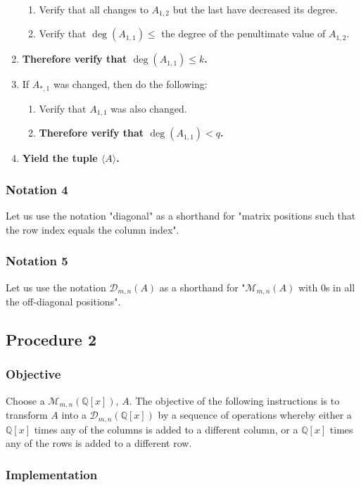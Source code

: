 \documentclass[twocolumn]{article}
\newcommand{\notation}[1]{\subsubsection*{Notation #1}}
\newcommand{\procedure}[2][]{\subsection*{Procedure #2 \ifthenelse{\equal{#1}{}}{}{(#1)}}\label{sec:procedure #2}}
\newcommand{\objective}{\subsubsection*{Objective}}
\newcommand{\implementation}{\subsubsection*{Implementation}}
\begin{document}
\begin{enumerate}
\begin{enumerate}
						\item Verify that all changes to $A_{1,2}$ but the last have decreased its degree.
						\item Verify that $\deg(A_{1,1})\le$ the degree of the penultimate value of $A_{1,2}$.
					\end{enumerate}
					\item \textbf{Therefore verify that $\deg(A_{1,1})\le k$.}
					\item If $A_{*,1}$ was changed, then do the following:
					\begin{enumerate}
						\item Verify that $A_{1,1}$ was also changed.
						\item \textbf{Therefore verify that $\deg(A_{1,1})<q$.}
					\end{enumerate}
					\item \textbf{Yield the tuple $\langle A\rangle$.}
				\end{enumerate}
		\notation{4}
			Let us use the notation "diagonal" as a shorthand for "matrix positions such that the row index equals the column index".
		\notation{5}
			Let us use the notation $\mathcal{D}_{m,n}(A)$ as a shorthand for "$\mathcal{M}_{m,n}(A)$ with $0$s in all the off-diagonal positions".
		\procedure{2}
			\objective
				Choose a $\mathcal{M}_{m,n}(\mathbb{Q}[x])$, $A$. The objective of the following instructions is to transform $A$ into a $\mathcal{D}_{m,n}(\mathbb{Q}[x])$ by a sequence of operations whereby either a $\mathbb{Q}[x]$ times any of the columns is added to a different column, or a $\mathbb{Q}[x]$ times any of the rows is added to a different row.
			\implementation
\end{document}
